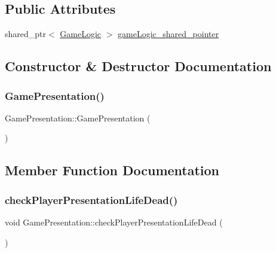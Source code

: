 \subsection*{Public Attributes}
\begin{DoxyCompactItemize}
\item 
shared\+\_\+ptr$<$ \hyperlink{class_game_logic}{Game\+Logic} $>$ \hyperlink{class_game_presentation_a2f149f73bdd87ded8a6d66ecc427352f}{game\+Logic\+\_\+shared\+\_\+pointer}
\end{DoxyCompactItemize}


\subsection{Constructor \& Destructor Documentation}
\mbox{\label{class_game_presentation_a14dbabbd4d03bd81522a95f235eefc4b}} 
\subsubsection{\texorpdfstring{Game\+Presentation()}{GamePresentation()}}
{\footnotesize\ttfamily Game\+Presentation\+::\+Game\+Presentation (\begin{DoxyParamCaption}{ }\end{DoxyParamCaption})}



\subsection{Member Function Documentation}
\mbox{\label{class_game_presentation_a027b38ee9bf11018b4db7494d2e145a0}} 
\subsubsection{\texorpdfstring{check\+Player\+Presentation\+Life\+Dead()}{checkPlayerPresentationLifeDead()}}
{\footnotesize\ttfamily void Game\+Presentation\+::check\+Player\+Presentation\+Life\+Dead (\begin{DoxyParamCaption}{ }\end{DoxyParamCaption})}

